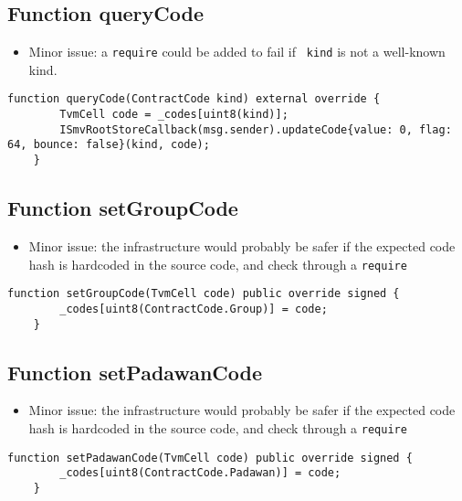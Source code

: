 \subsection{Function queryCode}

\begin{itemize}
\item Minor issue: a {\tt require} could be added to fail if {\tt
  kind} is not a well-known kind.
\end{itemize}

\begin{lstlisting}[firstnumber=31]
    function queryCode(ContractCode kind) external override {
        TvmCell code = _codes[uint8(kind)];
        ISmvRootStoreCallback(msg.sender).updateCode{value: 0, flag: 64, bounce: false}(kind, code);
    }
\end{lstlisting}

\subsection{Function setGroupCode}

\begin{itemize}
\item Minor issue: the infrastructure would probably be safer if the
  expected code hash is hardcoded in the source code, and check
  through a {\tt require}
\end{itemize}

\begin{lstlisting}[firstnumber=19]
    function setGroupCode(TvmCell code) public override signed {
        _codes[uint8(ContractCode.Group)] = code;
    }
\end{lstlisting}

\subsection{Function setPadawanCode}

\begin{itemize}
\item Minor issue: the infrastructure would probably be safer if the
  expected code hash is hardcoded in the source code, and check
  through a {\tt require}
\end{itemize}

\begin{lstlisting}[firstnumber=13]
    function setPadawanCode(TvmCell code) public override signed {
        _codes[uint8(ContractCode.Padawan)] = code;
    }
\end{lstlisting}

